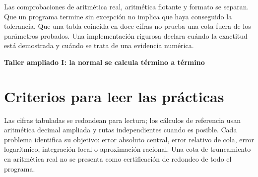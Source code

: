 \documentclass[11pt,a4paper]{article}
\theoremstyle{definition}
\newcommand{\parte}[1]{\par\bigskip\Needspace{8\baselineskip}\begin{center}{\Large\bfseries\color{azul}#1}\end{center}}
\newcounter{problema}
\begin{document}
Las comprobaciones de aritmética real, aritmética flotante y formato se separan. Que un programa termine sin excepción no implica que haya conseguido la tolerancia. Que una tabla coincida en doce cifras no prueba una cota fuera de los parámetros probados. Una implementación rigurosa declara cuándo la exactitud está demostrada y cuándo se trata de una evidencia numérica.


\parte{Taller ampliado I: la normal se calcula término a término}
\section{Criterios para leer las prácticas}
Las cifras tabuladas se redondean para lectura; los cálculos de referencia usan aritmética decimal ampliada y rutas independientes cuando es posible. Cada problema identifica su objetivo: error absoluto central, error relativo de cola, error logarítmico, integración local o aproximación racional. Una cota de truncamiento en aritmética real no se presenta como certificación de redondeo de todo el programa.
\end{document}
